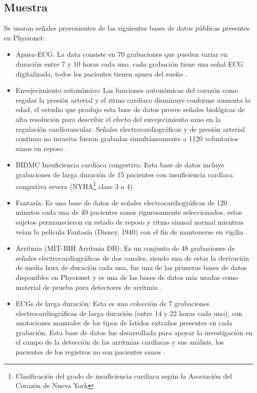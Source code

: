 \documentclass[12pt,letterpaper,oneside,openright]{book}
\begin{document}
\subsection{Muestra} 
Se usaran señales provenientes de las siguientes bases de datos públicas presentes en Physionet: 
\begin{itemize}
	\item Apnea-ECG: La data consiste en 70 grabaciones que pueden variar en duración entre 7 y 10 horas cada uno, cada grabación tiene una señal ECG digitalizada, todos los pacientes tienen apnea del sueño \cite{apneaDB}. 
	\item Envejecimiento autonómico: Las funciones autonómicas del corazón como regular la presión arterial y el ritmo cardíaco disminuye conforme aumenta la edad, el estudio que produjo esta base de datos provee señales biológicas de alta resolución para describir el efecto del envejecimiento sano en la regulación cardiovascular. Señales electrocardiográficas y de presión arterial continua no invasiva fueron grabadas simultáneamente a 1120 voluntarios sanos en reposo \cite{autonomicAgingDB}.
	\item BIDMC Insuficiencia cardíaca congestiva: Esta base de datos incluye grabaciones de larga duración de 15 pacientes con insuficiencia cardíaca congestiva severa (NYHA\footnote{Clasificación del grado de insuficiencia cardíaca según la Asociación del Corazón de Nueva York} clase 3 o 4) \cite{InsuficienciaCardiacaDB}
	\item Fantasía: Es una base de datos de señales electrocardiográficas de 120 minutos cada una de 40 pacientes sanos rigurosamente seleccionados, estos sujetos permanecieron en estado de reposo y ritmo sinusal normal mientras veían la película Fantasía (Disney, 1940) con el fin de mantenerse en vigilia \cite{fantasiaDB}.
	\item Arritmia (MIT-BIH Arritmia DB): Es un conjunto de 48 grabaciones de señales electrocardiográficas de dos canales, siendo una de estas la derivación  de media hora de duración cada una, fue una de las primeras bases de datos disponibles en Physionet y es una de las bases de datos más usadas como material de prueba para detectores de arritmia \cite{arritmiadb}. 
	\item ECGs de larga duración: Esta es una colección de 7 grabaciones electrocardiográficas de larga duración (entre 14 y 22 horas cada uno), con anotaciones manuales de los tipos de latidos extraños presentes en cada grabación. Esta base de datos fue desarrollada para apoyar la investigación en el campo de la detección de las arritmias cardíacas y sus análisis, los pacientes de los registros no son pacientes sanos \cite{longtermdb}.

\end{itemize}
\end{document}

